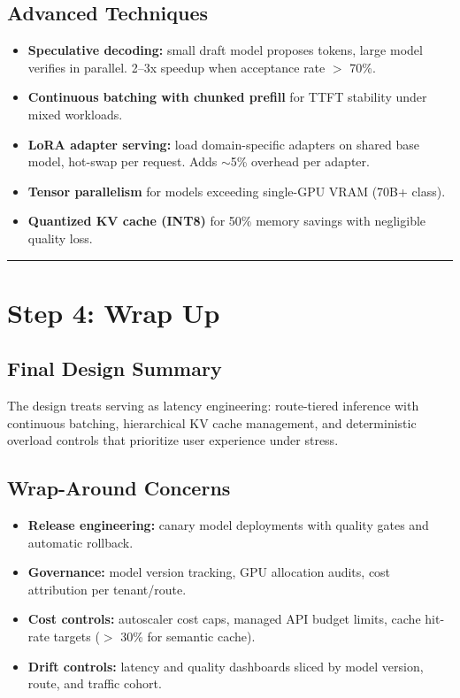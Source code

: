 \subsection*{Advanced Techniques}

\begin{itemize}
  \item \textbf{Speculative decoding:} small draft model proposes tokens, large model verifies in parallel. 2--3x speedup when acceptance rate $>$ 70\%.
  \item \textbf{Continuous batching with chunked prefill} for TTFT stability under mixed workloads.
  \item \textbf{LoRA adapter serving:} load domain-specific adapters on shared base model, hot-swap per request. Adds $\sim$5\% overhead per adapter.
  \item \textbf{Tensor parallelism} for models exceeding single-GPU VRAM (70B+ class).
  \item \textbf{Quantized KV cache (INT8)} for 50\% memory savings with negligible quality loss.
\end{itemize}

\bigskip\hrule\bigskip

\section*{Step 4: Wrap Up}

\subsection*{Final Design Summary}

The design treats serving as latency engineering: route-tiered inference with continuous batching, hierarchical KV cache management, and deterministic overload controls that prioritize user experience under stress.

\subsection*{Wrap-Around Concerns}

\begin{itemize}
  \item \textbf{Release engineering:} canary model deployments with quality gates and automatic rollback.
  \item \textbf{Governance:} model version tracking, GPU allocation audits, cost attribution per tenant/route.
  \item \textbf{Cost controls:} autoscaler cost caps, managed API budget limits, cache hit-rate targets ($>$ 30\% for semantic cache).
  \item \textbf{Drift controls:} latency and quality dashboards sliced by model version, route, and traffic cohort.
\end{itemize}

